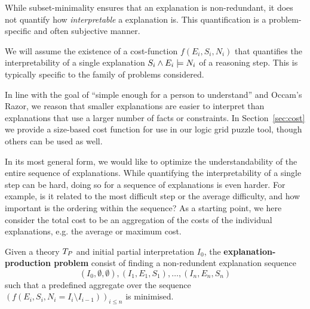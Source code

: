 While subset-minimality ensures that an explanation is non-redundant, it does not quantify how \textit{interpretable} a explanation is. 
This quantification is a problem-specific and often subjective manner. 

We will assume the existence of a cost-function $f(E_i,S_i,N_i)$ that quantifies the interpretability of a single explanation $S_i \wedge E_i \models N_i$ of a reasoning step. 
This is typically specific to the family of problems considered.

In line with the goal of ``simple enough for a person to understand'' and Occam's Razor, we reason that smaller explanations are easier to interpret than explanations that use a larger number of facts or constraints. %
In Section~\ref{sec:cost} we provide a size-based cost function for use in our logic grid puzzle tool, though others can be used as well.

In its most general form, we would like to optimize the understandability of the entire sequence of explanations. 
While quantifying the interpretability of a single step can be hard, doing so for a sequence of explanations is even harder. For example, is it related to the most difficult step or the average difficulty, and how important is the ordering within the sequence?
As a starting point, we here consider the total cost to be an aggregation of the costs of the individual explanations, e.g. the average or maximum cost.

\begin{definition}
Given a theory $T_P$ and initial partial interpretation $I_0$, the \textbf{explanation-production problem} consist of finding a non-redundent explanation sequence
\[(I_0,\emptyset,\emptyset), (I_1,E_1,S_1), \dots ,(I_n,E_n,S_n)\]
such that a predefined aggregate over the sequence $\left(f(E_i,S_i,N_i=I_i\setminus I_{i-1})\right)_{i\leq n}$ is minimised.
\end{definition} 

